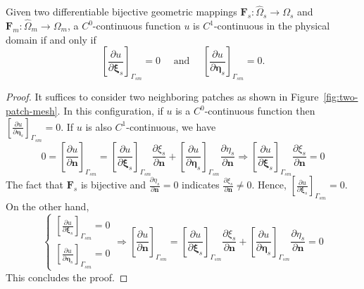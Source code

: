 \begin{lemma}
  Given two differentiable bijective geometric mappings $\mathbf{F}_{s}\colon\hat{\Omega}_s\rightarrow{\Omega}_s$ and $\mathbf{F}_{m}\colon\hat{\Omega}_m\rightarrow{\Omega}_m$, a $C^0$-continuous function $u$ is $C^1$-continuous in the physical domain if and only if
  \begin{equation}
    \left[\frac{\partial{u}}{\partial{\mathbf{\xi}_s}}\right]_{\Gamma_{sm}}=0\quad\text{ and }\quad\left[\frac{\partial{u}}{\partial{\mathbf{\eta}_s}}\right]_{\Gamma_{sm}}=0. \label{eq:biharmonic_c1_mod}
  \end{equation}

  \begin{proof}
    It suffices to consider two neighboring patches as shown in Figure~\ref{fig:two-patch-mesh}. In this configuration, if $u$ is a $ C^0$-continuous function then $[\frac{\partial{u}}{\partial{\mathbf{\eta}_s}}]_{\Gamma_{sm}}=0$. If $u$ is also $C^1$-continuous, we have
    \begin{equation}
      0=\left[\frac{\partial{u}}{\partial{\mathbf{n}}}\right]_{\Gamma_{sm}}=\left[\frac{\partial{u}}{\partial{\mathbf{\xi}_s}}\right]_{\Gamma_{sm}}\frac{\partial{}\xi_s}{\partial{\mathbf{n}}}+\left[\frac{\partial{u}}{\partial{\mathbf{\eta}_s}}\right]_{\Gamma_{sm}}\frac{\partial{}\eta_s}{\partial{\mathbf{n}}}\Longrightarrow\left[\frac{\partial{u}}{\partial{\mathbf{\xi}_s}}\right]_{\Gamma_{sm}}\frac{\partial{}\xi_s}{\partial{\mathbf{n}}}=0
    \end{equation}
    The fact that $\mathbf{F}_{s}$ is bijective and $\frac{\partial{}\eta_s}{\partial{\mathbf{n}}} = 0$ indicates $\frac{\partial{}\xi_s}{\partial{\mathbf{n}}}\neq{}0$. Hence, $\left[\frac{\partial{u}}{\partial{\mathbf{\xi}_s}}\right]_{\Gamma_{sm}}=0$. On the other hand,
    \begin{equation}
      \begin{cases}
        \left[\frac{\partial{u}}{\partial{\mathbf{\xi}_s}}\right]_{\Gamma_{sm}}=0 \\
        \left[\frac{\partial{u}}{\partial{\mathbf{\eta}_s}}\right]_{\Gamma_{sm}}=0
      \end{cases}
      \Longrightarrow
      \left[\frac{\partial{u}}{\partial{\mathbf{n}}}\right]_{\Gamma_{sm}}=\left[\frac{\partial{u}}{\partial{\mathbf{\xi}_s}}\right]_{\Gamma_{sm}}\frac{\partial{}\xi_s}{\partial{\mathbf{n}}}+\left[\frac{\partial{u}}{\partial{\mathbf{\eta}_s}}\right]_{\Gamma_{sm}}\frac{\partial{}\eta_s}{\partial{\mathbf{n}}}=0
    \end{equation}
    This concludes the proof.
  \end{proof}
\end{lemma}

